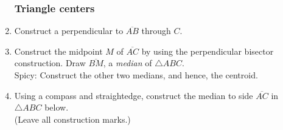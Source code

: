 \documentclass[12pt, twoside]{article}
\begin{document}
\begin{enumerate}
\newpage
\subsubsection*{Triangle centers}

  \item Construct a perpendicular to $\overline{AB}$ through $C$.\\
    \vspace{1cm}
    \begin{center}
    \end{center}
    \vspace{4cm}

  \item Construct the midpoint $M$ of $\overline{AC}$ by using the perpendicular bisector construction. Draw $\overline{BM}$, a \emph{median} of $\triangle ABC$.\\
  Spicy: Construct the other two medians, and hence, the centroid.
    \begin{center}
  \end{center} %

  \item Using  a  compass  and  straightedge,  construct  the  median  to  side $\overline{AC}$ in $\triangle ABC$ below.\\ (Leave all construction marks.)
    \begin{center}
    \end{center}


\end{enumerate}
\end{document}

